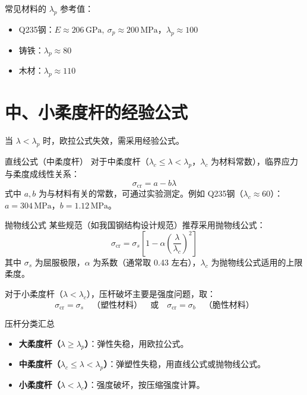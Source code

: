 常见材料的 \(\lambda_p\) 参考值：
\begin{itemize}
    \item Q235钢：\(E \approx 206 \,\text{GPa},\ \sigma_p \approx 200 \,\text{MPa}\)，\(\lambda_p \approx 100\)
    \item 铸铁：\(\lambda_p \approx 80\)
    \item 木材：\(\lambda_p \approx 110\)
\end{itemize}

\section{中、小柔度杆的经验公式}

当 \(\lambda < \lambda_p\) 时，欧拉公式失效，需采用经验公式。

\begin{mydefinition}{直线公式（中柔度杆）}
    对于中柔度杆（\(\lambda_c \le \lambda < \lambda_p\)，\(\lambda_c\) 为材料常数），临界应力与柔度成线性关系：
    \[
    \sigma_{\text{cr}} = a - b\lambda
    \]
    式中 \(a, b\) 为与材料有关的常数，可通过实验测定。例如 Q235钢（\(\lambda_c \approx 60\)）：\(a = 304 \,\text{MPa}\)，\(b = 1.12 \,\text{MPa}\)。
\end{mydefinition}

\begin{mydefinition}{抛物线公式}
    某些规范（如我国钢结构设计规范）推荐采用抛物线公式：
    \[
    \sigma_{\text{cr}} = \sigma_s \left[ 1 - \alpha \left( \frac{\lambda}{\lambda_c} \right)^2 \right]
    \]
    其中 \(\sigma_s\) 为屈服极限，\(\alpha\) 为系数（通常取 0.43 左右），\(\lambda_c\) 为抛物线公式适用的上限柔度。
\end{mydefinition}

对于小柔度杆（\(\lambda < \lambda_c\)），压杆破坏主要是强度问题，取：
\[
\sigma_{\text{cr}} = \sigma_s \quad \text{（塑性材料）} \quad \text{或} \quad \sigma_{\text{cr}} = \sigma_b \quad \text{（脆性材料）}
\]

\begin{myhypothesis}{压杆分类汇总}
    \begin{itemize}
        \item \textbf{大柔度杆（\(\lambda \ge \lambda_p\)）}：弹性失稳，用欧拉公式。
        \item \textbf{中柔度杆（\(\lambda_c \le \lambda < \lambda_p\)）}：弹塑性失稳，用直线公式或抛物线公式。
        \item \textbf{小柔度杆（\(\lambda < \lambda_c\)）}：强度破坏，按压缩强度计算。
    \end{itemize}
\end{myhypothesis}

